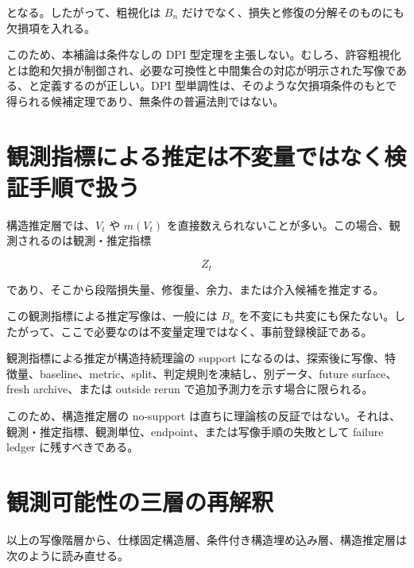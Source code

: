 \documentclass[12pt,a4paper]{article}
\begin{document}
となる。したがって、粗視化は \(B_{n}\) だけでなく、損失と修復の分解そのものにも欠損項を入れる。

このため、本補論は条件なしの DPI 型定理を主張しない。むしろ、許容粗視化とは飽和欠損が制御され、必要な可換性と中間集合の対応が明示された写像である、と定義するのが正しい。DPI 型単調性は、そのような欠損項条件のもとで得られる候補定理であり、無条件の普遍法則ではない。

\section{観測指標による推定は不変量ではなく検証手順で扱う}\label{ux89b3ux6e2cux6307ux6a19ux306bux3088ux308bux63a8ux5b9aux306fux4e0dux5909ux91cfux3067ux306fux306aux304fux691cux8a3cux624bux9806ux3067ux6271ux3046}

構造推定層では、\(V_{t}\) や \(m(V_{t})\) を直接数えられないことが多い。この場合、観測されるのは観測・推定指標

\[
Z_{t}
\]

であり、そこから段階損失量、修復量、余力、または介入候補を推定する。

この観測指標による推定写像は、一般には \(B_{n}\) を不変にも共変にも保たない。したがって、ここで必要なのは不変量定理ではなく、事前登録検証である。

観測指標による推定が構造持続理論の support になるのは、探索後に写像、特徴量、baseline、metric、split、判定規則を凍結し、別データ、future surface、fresh archive、または outside rerun で追加予測力を示す場合に限られる。

このため、構造推定層の no-support は直ちに理論核の反証ではない。それは、観測・推定指標、観測単位、endpoint、または写像手順の失敗として failure ledger に残すべきである。

\section{観測可能性の三層の再解釈}\label{ux89b3ux6e2cux53efux80fdux6027ux306eux4e09ux5c64ux306eux518dux89e3ux91c8}

以上の写像階層から、仕様固定構造層、条件付き構造埋め込み層、構造推定層は次のように読み直せる。
\end{document}
